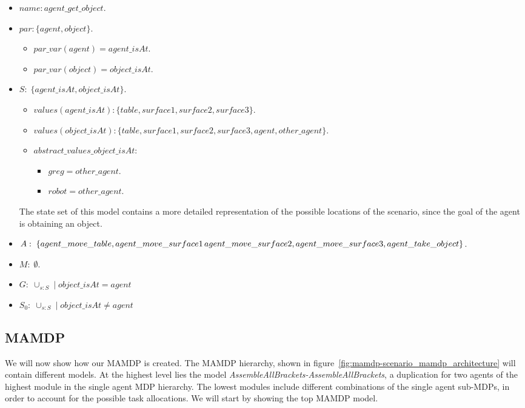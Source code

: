\begin{itemize}
	\item $name: agent\_get\_object$.
	\item		$par: \{agent,object\}$.
		\begin{itemize}
			\item $par\_var(agent)=agent\_isAt$.
			\item $par\_var(object)=object\_isAt$.
		\end{itemize}

	\item $S:\;\{agent\_isAt,object\_isAt\}$. 
		\begin{itemize}
			\item $values(agent\_isAt):\{table,surface1,surface2,surface3\}$.
			\item $values(object\_isAt):\{table,surface1,surface2,surface3,agent,other\_agent\}$. 
		\end{itemize}
		\begin{itemize}
			\item $abstract\_values\_object\_isAt$:
				\begin{itemize}
					\item $greg=other\_agent$.
					\item $robot=other\_agent$.
				\end{itemize}	
		\end{itemize}
		The state set of this model contains a more detailed representation of the possible locations of the scenario, since the goal of the agent is obtaining an object.		

	\item $A:\;\{agent\_move\_table, agent\_move\_surface1\, agent\_move\_surface2, \\ 
	agent\_move\_surface3, agent\_take\_object\}$.
	\item $M:\;{\emptyset}$.
	\item $G:\; \cup_{s:S} \; | \; object\_isAt=agent$
	\item $S_0:\; \cup_{s:S} \; | \; object\_isAt \neq agent$
\end{itemize}

\subsection{MAMDP}
We will now show how our MAMDP is created. The MAMDP hierarchy, shown in figure~\ref{fig:mamdp-scenario_mamdp_architecture} will contain different models. At the highest level lies the model \textit{AssembleAllBrackets-AssembleAllBrackets}, a duplication for two agents of the highest module in the single agent MDP hierarchy. The lowest modules include different combinations of the single agent sub-MDPs, in order to account for the possible task allocations. We will start by showing the top MAMDP model.

